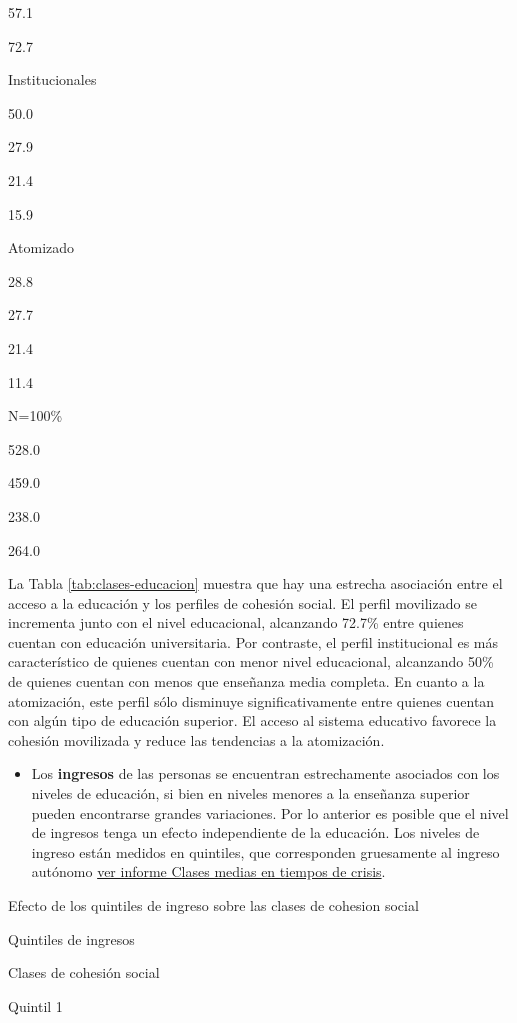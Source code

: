 \documentclass[
  12pt,
]{book}
\providecommand{\tightlist}{%
  \setlength{\itemsep}{0pt}\setlength{\parskip}{0pt}}
\begin{document}
57.1

72.7

Institucionales

50.0

27.9

21.4

15.9

Atomizado

28.8

27.7

21.4

11.4

N=100\%

528.0

459.0

238.0

264.0

La Tabla \ref{tab:clases-educacion} muestra que hay una estrecha asociación entre el acceso a la educación y los perfiles de cohesión social. El perfil movilizado se incrementa junto con el nivel educacional, alcanzando 72.7\% entre quienes cuentan con educación universitaria. Por contraste, el perfil institucional es más característico de quienes cuentan con menor nivel educacional, alcanzando 50\% de quienes cuentan con menos que enseñanza media completa. En cuanto a la atomización, este perfil sólo disminuye significativamente entre quienes cuentan con algún tipo de educación superior. El acceso al sistema educativo favorece la cohesión movilizada y reduce las tendencias a la atomización.

\begin{itemize}
\tightlist
\item
  Los \textbf{ingresos} de las personas se encuentran estrechamente asociados con los niveles de educación, si bien en niveles menores a la enseñanza superior pueden encontrarse grandes variaciones. Por lo anterior es posible que el nivel de ingresos tenga un efecto independiente de la educación. Los niveles de ingreso están medidos en quintiles, que corresponden gruesamente al ingreso autónomo \href{https://drive.google.com/file/d/12PsOPviSGwowOsxzvZn_vhwEoMbyMkl3/view}{ver informe Clases medias en tiempos de crisis}.
\end{itemize}

\label{tab:clases-ingresos}Efecto de los quintiles de ingreso sobre las clases de cohesion social

Quintiles de ingresos

Clases de cohesión social

Quintil 1
\end{document}
